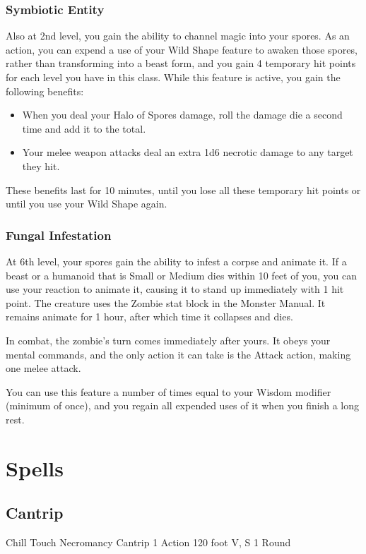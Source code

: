 {\subsubsection*{Symbiotic Entity}
Also at 2nd level, you gain the ability to channel magic into your spores. As an action, you can expend a use of your Wild Shape feature to awaken those spores, rather than transforming into a beast form, and you gain 4 temporary hit points for each level you have in this class. While this feature is active, you gain the following benefits:
\begin{itemize}
	\item When you deal your Halo of Spores damage, roll the damage die a second time and add it to the total.
	\item Your melee weapon attacks deal an extra 1d6 necrotic damage to any target they hit.
\end{itemize}
These benefits last for 10 minutes, until you lose all these temporary hit points or until you use your Wild Shape again.
\subsubsection*{Fungal Infestation}
At 6th level, your spores gain the ability to infest a corpse and animate it. If a beast or a humanoid that is Small or Medium dies within 10 feet of you, you can use your reaction to animate it, causing it to stand up immediately with 1 hit point. The creature uses the Zombie stat block in the Monster Manual. It remains animate for 1 hour, after which time it collapses and dies.

In combat, the zombie's turn comes immediately after yours. It obeys your mental commands, and the only action it can take is the Attack action, making one melee attack.

You can use this feature a number of times equal to your Wisdom modifier (minimum of once), and you regain all expended uses of it when you finish a long rest.

\section*{Spells}
\subsection*{Cantrip}

\DndSpellHeader
  {Chill Touch}
  {Necromancy Cantrip}
  {1 Action}
  {120 foot}
  {V, S}
  {1 Round}

}
